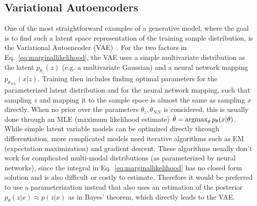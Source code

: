 \subsection{Variational Autoencoders}
One of the most straightforward examples of a generative model, where the goal is to find such a latent space representation of the training sample distribution, is the Variational Autoencoder (VAE)~\autocite{kingma2013autoencoding}. For the two factors in Eq.~\ref{eq:marginallikelihood}, the VAE uses a simple multivariate distribution as the latent $p_{\theta_z}(z)$ (e.g. a multivariate Gaussian) and a neural network mapping $p_{\theta_{NN}}(x|z)$. Training then includes finding optimal parameters for the parameterized latent distribution and for the neural network mapping, such that sampling $z$ and mapping it to the sample space is almost the same as sampling $x$ directly. When no prior over the parameters $\theta_z, \theta_{NN}$ is considered, this is usually done through an MLE (maximum likelihood estimate) $\hat{\theta} = \operatorname*{argmax}_{\theta} p_{\theta}(x|\theta)$. While simple latent variable models can be optimized directly through differentiation, more complicated models need iterative algorithms such as EM (expectation maximization) and gradient descent. These algorithms usually don't work for complicated multi-modal distributions (as parameterized by neural networks), since the integral in Eq.~\ref{eq:marginallikelihood} has no closed form solution and is also difficult or costly to estimate. Therefore it would be preferred to use a parameterization instead that also uses an estimation of the posterior $p_{\theta}(z|x) \approx p(z|x)$ as in Bayes' theorem, which directly leads to the VAE.

